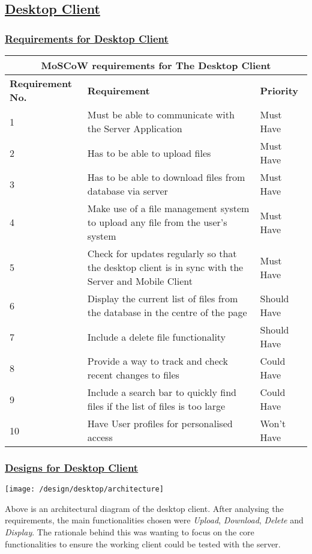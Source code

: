 \documentclass{article}
\begin{document}
\subsection{\underline{Desktop Client}}

\subsubsection{\underline{Requirements for Desktop Client}}
\begin{tabular}{|p{3cm}|p{5cm}|p{4cm}|}
\hline
\multicolumn{3}{|c|}{\textbf{MoSCoW requirements for The Desktop Client}} \\
\hline
\textbf{Requirement No.} & \textbf{Requirement} & \textbf{Priority}\\
\hline
1 & Must be able to communicate with the Server Application & Must Have \\
\hline
2 & Has to be able to upload files & Must Have \\
\hline
3 & Has to be able to download files from database via server & Must Have \\
\hline
4 & Make use of a file management system to upload any file from the user's system & Must Have \\
\hline
5 & Check for updates regularly so that the desktop client is in sync with the Server and Mobile Client & Must Have\\
\hline
6 & Display the current list of files from the database in the centre of the page & Should Have \\
\hline
7 & Include a delete file functionality   & Should Have \\
\hline
8 & Provide a way to track and check recent changes to files & Could Have\\
\hline
9 & Include a search bar to quickly find files if the list of files is too large & Could Have \\
\hline
10 & Have User profiles for personalised access & Won't Have \\
\hline
\end{tabular}

\subsubsection{\underline{Designs for Desktop Client}}

\texttt{[image: /design/desktop/architecture]}

Above is an architectural diagram of the desktop client. After analysing the requirements, the main functionalities chosen were \textit{Upload}, \textit{Download}, \textit{Delete} and \textit{Display}. The rationale behind this was wanting to focus on the core functionalities to ensure the working client could be tested with the server.
\end{document}

